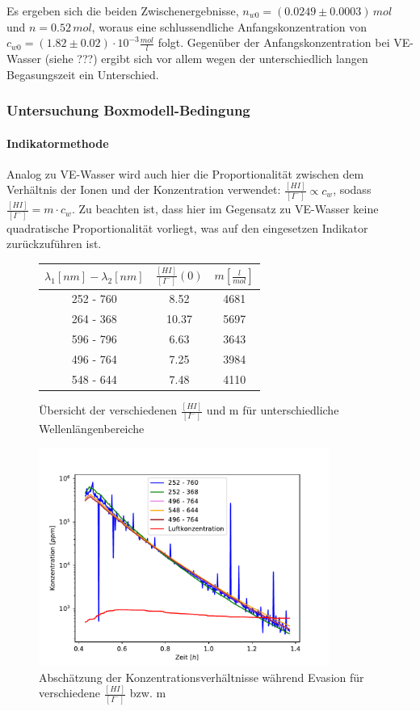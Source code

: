 \documentclass[12pt]{article}
\begin{document}
Es ergeben sich die beiden Zwischenergebnisse, $n_{w0} = (0.0249 \pm 0.0003) \,mol$ und $n = 0.52 \, mol$, woraus eine schlussendliche
Anfangskonzentration von $c_{w0} = (1.82 \pm 0.02)\cdot 10^{-3} \frac{mol}{l}$ folgt. Gegenüber der Anfangskonzentration bei VE-Wasser (siehe ???)
ergibt sich vor allem wegen der unterschiedlich langen Begasungszeit ein Unterschied.


\subsubsection{Untersuchung Boxmodell-Bedingung\\}

\paragraph{Indikatormethode\\}

Analog zu VE-Wasser wird auch hier die Proportionalität zwischen dem Verhältnis der Ionen und der Konzentration verwendet: $\frac{[HI]}{[I^-]} \propto c_w $, sodass $\frac{[HI]}{[I^-]} = m \cdot c_w $. Zu beachten ist, dass hier im Gegensatz zu VE-Wasser keine quadratische Proportionalität vorliegt, was auf den eingesetzen Indikator zurückzuführen ist.  \\

\begin{figure}[H]
	\centering
	\parbox{57.5mm}{
		\centering
		\begin{tabular}{c|c|c}
			$\lambda_1 [nm] - \lambda_2 [nm]$ & $\frac{[HI]}{[I^-]}(0)$ & $m [\frac{l}{mol}]$ \\ \hline
			252 - 760 & 8.52 & 4681 \\
			264 - 368 & 10.37 & 5697 \\
			596 - 796 & 6.63 & 3643 \\
			496 - 764 & 7.25 & 3984 \\
			548 - 644 & 7.48 & 4110
		\end{tabular}
		\caption{Übersicht der verschiedenen $\frac{[HI]}{[I^-]}$ und m für unterschiedliche Wellenlängenbereiche}
	}
	\hfill%
	\parbox{95mm}{
		\centering
		\includegraphics[width=95mm]{Meerwasser/Indikator.pdf}
		\caption{Abschätzung der Konzentrationsverhältnisse während Evasion für verschiedene $\frac{[HI]}{[I^-]}$ bzw. m}
	}
\end{figure}
\end{document}
